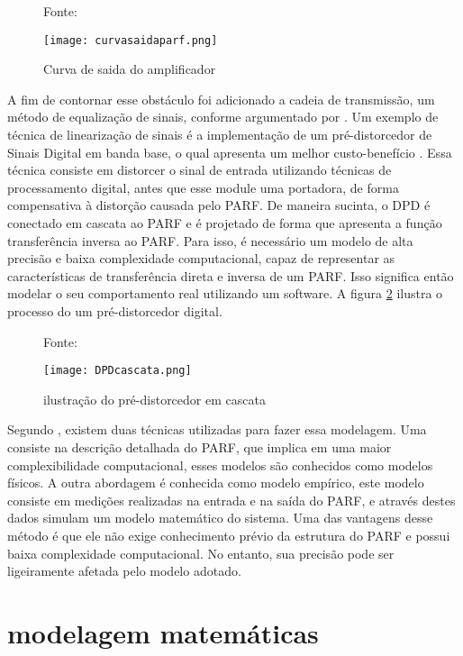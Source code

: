 \begin{figure}[ht!]
    \centering
    \captionsetup{justification=centering}
    \caption*{Fonte: \cite{Chavez2018}}
    \texttt{[image: curvasaidaparf.png]}
    \caption{Curva de saida do amplificador}
    \label{fig:saidaparf}
\end{figure}

A fim de contornar esse obstáculo foi adicionado a cadeia de transmissão, um método de equalização de sinais, conforme argumentado por \cite{Kenington2000}. Um exemplo de técnica de linearização de sinais é a implementação de um pré-distorcedor de Sinais Digital em banda base, o qual apresenta um melhor custo-benefício \cite{Kenington2000}. Essa técnica consiste em distorcer o sinal de entrada utilizando técnicas de processamento digital, antes que esse module uma portadora, de forma compensativa à distorção causada pelo PARF. De maneira sucinta, o DPD é conectado em cascata ao PARF e é projetado de forma que apresenta a função transferência inversa ao PARF. Para isso, é necessário um modelo de alta precisão e baixa complexidade computacional, capaz de representar as características de transferência direta e inversa de um PARF. Isso significa então modelar o seu comportamento real utilizando um software.  A figura \ref{fig:cascatadpd} ilustra o processo do um pré-distorcedor digital.

\begin{figure}[h!]
    \centering
    \captionsetup{justification=centering}
    \caption*{Fonte: \cite{Chavez2018}}
    \texttt{[image: DPDcascata.png]}
    \caption{ilustração do pré-distorcedor em cascata}
    \label{fig:cascatadpd}
\end{figure}

Segundo \cite{John2016}, existem duas técnicas utilizadas para fazer essa modelagem. Uma consiste na descrição detalhada do PARF, que implica em uma maior complexibilidade computacional, esses modelos são conhecidos como modelos físicos. A outra abordagem é conhecida como modelo empírico, este modelo consiste em medições realizadas na entrada e na saída do PARF, e através destes dados simulam um modelo matemático do sistema. Uma das vantagens desse método é que ele não exige conhecimento prévio da estrutura do PARF e possui baixa complexidade computacional. No entanto, sua precisão pode ser ligeiramente afetada pelo modelo adotado.
\section{modelagem matemáticas}



